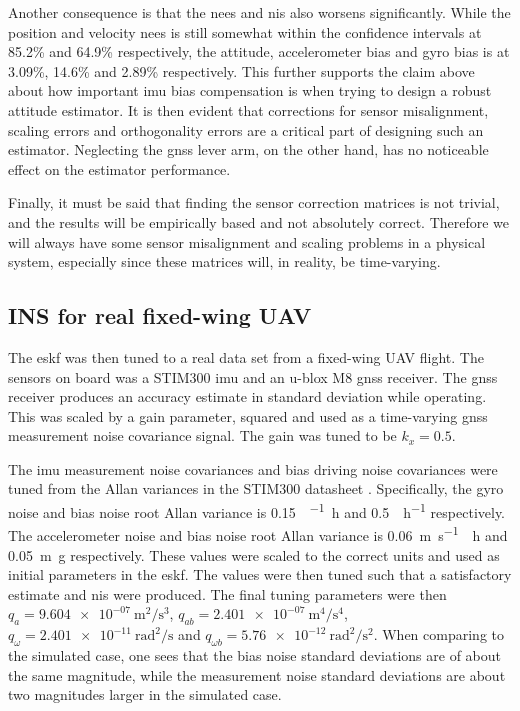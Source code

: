 Another consequence is that the \acrshort{nees} and \acrshort{nis} also worsens significantly. While the position and velocity \acrshort{nees} is still somewhat within the confidence intervals at 85.2\% and 64.9\% respectively, the attitude, accelerometer bias and gyro bias is at 3.09\%, 14.6\% and 2.89\% respectively. This further supports the claim above about how important \acrshort{imu} bias compensation is when trying to design a robust attitude estimator. It is then evident that corrections for sensor misalignment, scaling errors and orthogonality errors are a critical part of designing such an estimator. Neglecting the \acrshort{gnss} lever arm, on the other hand, has no noticeable effect on the estimator performance.

Finally, it must be said that finding the sensor correction matrices is not trivial, and the results will be empirically based and not absolutely correct. Therefore we will always have some sensor misalignment and scaling problems in a physical system, especially since these matrices will, in reality, be time-varying.

\subsection{INS for real fixed-wing UAV}


The \acrshort{eskf} was then tuned to a real data set from a fixed-wing UAV flight. The sensors on board was a STIM300 \acrshort{imu} and an u-blox M8 \acrshort{gnss} receiver. The \acrshort{gnss} receiver produces an accuracy estimate in standard deviation while operating. This was scaled by a gain parameter, squared and used as a time-varying \acrshort{gnss} measurement noise covariance signal. The gain was tuned to be $k_x = 0.5$.

The \acrshort{imu} measurement noise covariances and bias driving noise covariances were tuned from the Allan variances in the STIM300 datasheet \cite{stim300}. Specifically, the gyro noise and bias noise root Allan variance is \SI{0.15}{\deg\per\sqrt\hour} and \SI{0.5}{\deg\per\hour} respectively. The accelerometer noise and bias noise root Allan variance is \SI{0.06}{\meter\per\second\sqrt\hour} and \SI{0.05}{\meter g} respectively. These values were scaled to the correct units and used as initial parameters in the \acrshort{eskf}. The values were then tuned such that a satisfactory estimate and \acrshort{nis} were produced. The final tuning parameters were 
then $q_{a} = \SI{9.604e-07}{\meter\squared\per\second\cubed}$, $ q_{ab} = \SI{2.401e-07}{\meter\tothe{4}\per\second\tothe{4}}$, $q_{\omega} = \SI{2.401e-11}{\radian\squared\per\second}$ and $q_{\omega b} = \SI{5.76e-12}{\radian\squared\per\second\squared}$. When comparing to the simulated case, one sees that the bias noise standard deviations are of about the same magnitude, while the measurement noise standard deviations are about two magnitudes larger in the simulated case.

